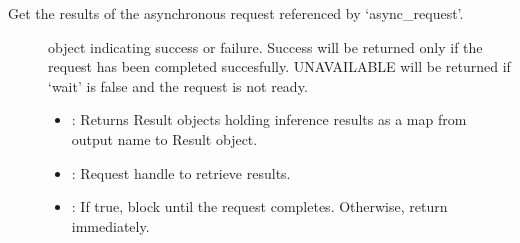 \documentclass[letterpaper,10pt,english]{sphinxmanual}
\begin{document}
\begin{fulllineitems}
\begin{fulllineitems}
\label{\detokenize{cpp_api/classnvidia_1_1inferenceserver_1_1client_1_1InferGrpcContext:_CPPv4N6nvidia15inferenceserver6client16InferGrpcContext18GetAsyncRunResultsEP9ResultMapRKNSt10shared_ptrI7RequestEEb}}%
\pysigstartmultiline
{}\label{\detokenize{cpp_api/classnvidia_1_1inferenceserver_1_1client_1_1InferGrpcContext:classnvidia_1_1inferenceserver_1_1client_1_1InferGrpcContext_1af701c02c211163d37ac940a9816cf9ab}}%
\pysigstopmultiline
Get the results of the asynchronous request referenced by ‘async\_request’. 

\begin{description}
\item[{}] \leavevmode
{\hyperref[\detokenize{cpp_api/classnvidia_1_1inferenceserver_1_1client_1_1Error:classnvidia_1_1inferenceserver_1_1client_1_1Error}]{}} object indicating success or failure. Success will be returned only if the request has been completed succesfully. UNAVAILABLE will be returned if ‘wait’ is false and the request is not ready. 

\item[{}] \leavevmode\begin{itemize}
\item {} 
: Returns Result objects holding inference results as a map from output name to Result object. 

\item {} 
: Request handle to retrieve results. 

\item {} 
: If true, block until the request completes. Otherwise, return immediately. 

\end{itemize}

\end{description}


\end{fulllineitems}


\end{fulllineitems}
\end{document}
